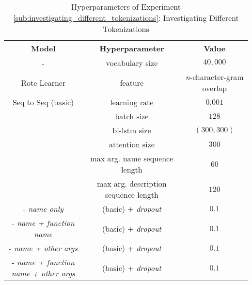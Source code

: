 \begin{table}[h!]
\begin{center}
\begin{tabular}{ c | c | c  }
    \textbf{Model}                           {}  & \textbf{Hyperparameter}  & \textbf{Value}    \\
    \hline
    -                                 & vocabulary size            & $40,000$ \\
    \hline
    Rote Learner                      & feature                    & \textit{n}-character-gram overlap \\
    \hline
    Seq to Seq  (basic)               & learning rate              & $0.001$         \\
                                      & batch size                 & $128$           \\
                                      & bi-lstm size               & $(300,300) $    \\
                                      & attention size             & $300$           \\
                                      & max arg. name sequence length         & $60$   \\
                                      & max arg. description sequence length  & $120$  \\
    \hdashline
    - \textit{name only}              & (basic) + \textit{dropout}           & $0.1$           \\
    - \textit{name + function name}   & (basic) + \textit{dropout}           & $0.1$           \\
    - \textit{name + other args}      & (basic) + \textit{dropout}           & $0.1$           \\
    - \textit{name + function name + other args} & (basic) + \textit{dropout}   & $0.1$        \\
\end{tabular}
\caption {Hyperparameters of Experiment \ref{sub:investigating_different_tokenizations}: Investigating Different Tokenizations }
\label{table:hyperparams_different_tokenizations}
\end{center}
\end{table}


